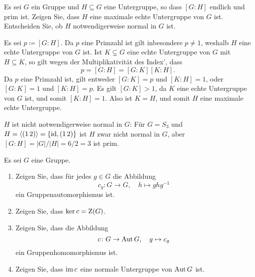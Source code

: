 \begin{question}[subtitle = Ein Kriterium für maximale Untergruppen]
  Es sei $G$ ein Gruppe und $H \subseteq G$ eine Untergruppe, so dass $[G : H]$ endlich und prim ist.
  Zeigen Sie, dass $H$ eine maximale echte Untergruppe von $G$ ist. Entscheiden Sie, ob $H$ notwendigerweise normal in $G$ ist.
\end{question}


\begin{solution}
  Es sei $p \coloneqq [G : H]$.
  Da $p$ eine Primzahl ist gilt inbesondere $p \neq 1$, weshalb $H$ eine echte Untergruppe von $G$ ist.
  Ist $K \subsetneq G$ eine echte Untergruppe von $G$ mit $H \subseteq K$, so gilt wegen der Multiplikativität des Index’, dass 
  \[
      p
    = [G : H]
    = [G : K] [K : H].
  \]
  Da $p$ eine Primzahl ist, gilt entweder $[G : K] = p$ und $[K : H] = 1$, oder $[G : K] = 1$ und $[K : H] = p$.
  Es gilt $[G : K] > 1$, da $K$ eine echte Untergruppe von $G$ ist, und somit $[K : H] = 1$.
  Also ist $K = H$, und somit $H$ eine maximale echte Untergruppe.
  
  $H$ ist nicht notwendigerweise normal in $G$:
  Für $G = S_3$ und $H = \left\langle (1\,2) \right\rangle = \{\operatorname{id}, (1\,2)\}$ ist $H$ zwar nicht normal in $G$, aber $[G : H] = |G|/|H| = 6/2 = 3$ ist prim.
\end{solution}


\begin{question}[subtitle = Innere Automorphismen]
  Es sei $G$ eine Gruppe.
  \begin{enumerate}
    \item
      Zeigen Sie, dass für jedes $g \in G$ die Abbildung
      \[
                c_g
        \colon  G \to G,
        \quad   h \mapsto ghg^{-1}
      \]
      ein Gruppenautomorphismus ist.
    \item
      Zeigen Sie, dass $\ker c = \operatorname{Z}(G)$.
    \item
      Zeigen Sie, dass die Abbildung
      \[
                c
        \colon  G \to \operatorname{Aut} G,
        \quad   g \mapsto c_g
      \]
      ein Gruppenhomomorphismus ist.
    \item
      Zeigen Sie, dass $\operatorname{im} c$ eine normale Untergruppe von $\operatorname{Aut} G$ ist.
  \end{enumerate}
\end{question}




